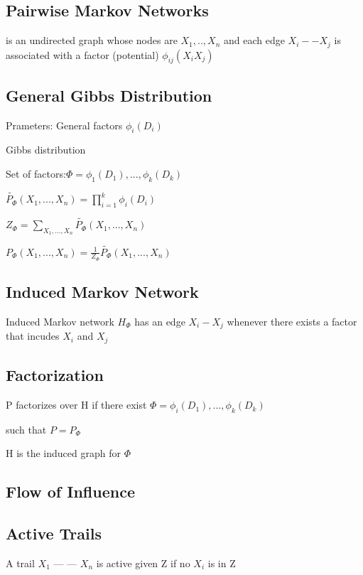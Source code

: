 \documentclass{book}
\begin{document}
\subsection{Pairwise Markov Networks}

is an undirected graph whose nodes are $X_1,..,X_n$ and each edge $X_i -- X_j$ is associated with a factor (potential) $\phi_{ij}(X_i X_j)$

\subsection{General Gibbs Distribution}
Prameters: General factors $\phi_i(D_i)$

Gibbs distribution

Set of factors:$\Phi = { \phi_1(D_1), ..., \phi_k(D_k)}$

$\widetilde{P_{\Phi}}(X_1,..., X_n) = \prod_{i=1}^{k} \phi_i(D_i)$

$Z_{\Phi} = \sum_{X_1,...,X_n} \widetilde{P_{\Phi}}(X_1,...,X_n)$

$P_{\Phi}(X_1,..., X_n) = \frac{1}{Z_{\Phi}}  \widetilde{P_{\Phi}}(X_1,..., X_n) $



\subsection{Induced Markov Network}
Induced Markov network $H_{\Phi}$ has an edge $X_i - X_j$ whenever there exists a factor that incudes $X_i$ and $X_j$

\subsection{Factorization}
P factorizes over H if there exist $\Phi={\phi_i(D_1), ..., \phi_k(D_k)}$ 


such that $P = P_\Phi$

H is the induced graph for $\Phi$

\subsection{Flow of Influence}

\subsection{Active Trails}

A trail $X_1$ --- --- $X_n$ is active given Z if no $X_i$ is in Z
\end{document}
